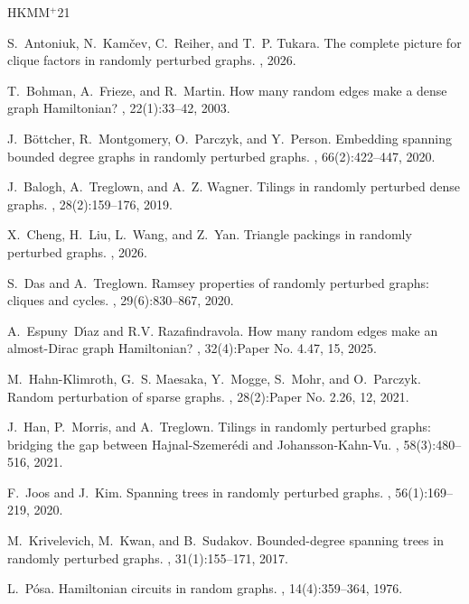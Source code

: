 \documentclass[11pt,reqno]{amsart}
\theoremstyle{definition}
\theoremstyle{remark}
\begin{document}
\newcommand{\etalchar}[1]{$^{#1}$}
\begin{thebibliography}{HKMM{\etalchar{+}}21}

S.~Antoniuk, N.~Kam\v{c}ev, C.~Reiher, and T.~P. Tukara.
\newblock The complete picture for clique factors in randomly perturbed graphs.
, 2026.

T.~Bohman, A.~Frieze, and R.~Martin.
\newblock How many random edges make a dense graph {H}amiltonian?
, 22(1):33--42, 2003.

J.~B\"{o}ttcher, R.~Montgomery, O.~Parczyk, and Y.~Person.
\newblock Embedding spanning bounded degree graphs in randomly perturbed graphs.
, 66(2):422--447, 2020.

J.~Balogh, A.~Treglown, and A.~Z. Wagner.
\newblock Tilings in randomly perturbed dense graphs.
, 28(2):159--176, 2019.

X.~Cheng, H.~Liu, L.~Wang, and Z.~Yan.
\newblock Triangle packings in randomly perturbed graphs.
, 2026.

S.~Das and A.~Treglown.
\newblock Ramsey properties of randomly perturbed graphs: cliques and cycles.
, 29(6):830--867, 2020.

A.~Espuny~D\'{\i}az and R.V. Razafindravola.
\newblock How many random edges make an almost-{D}irac graph {H}amiltonian?
, 32(4):Paper No. 4.47, 15, 2025.

\bibitem[HKMM{\etalchar{+}}21]{HMMMP}
M.~Hahn-Klimroth, G.~S. Maesaka, Y.~Mogge, S.~Mohr, and O.~Parczyk.
\newblock Random perturbation of sparse graphs.
, 28(2):Paper No. 2.26, 12, 2021.

J.~Han, P.~Morris, and A.~Treglown.
\newblock Tilings in randomly perturbed graphs: bridging the gap between {H}ajnal-{S}zemer\'{e}di and {J}ohansson-{K}ahn-{V}u.
, 58(3):480--516, 2021.

F.~Joos and J.~Kim.
\newblock Spanning trees in randomly perturbed graphs.
, 56(1):169--219, 2020.

M.~Krivelevich, M.~Kwan, and B.~Sudakov.
\newblock Bounded-degree spanning trees in randomly perturbed graphs.
, 31(1):155--171, 2017.

L.~P\'{o}sa.
\newblock Hamiltonian circuits in random graphs.
, 14(4):359--364, 1976.

\end{thebibliography}
\end{document}
